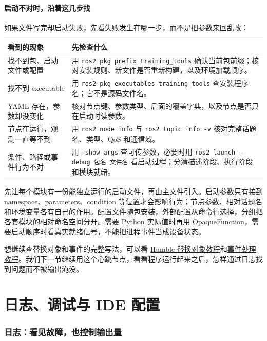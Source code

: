 \paragraph*{启动不对时，沿着这几步找}
如果文件写完却启动失败，先看失败发生在哪一步，而不是把参数来回乱改：
\begin{center}
\begin{tabular}{p{}p{}}
\toprule[1.5pt]
看到的现象 & 先检查什么 \\
\midrule[1pt]
找不到包、启动文件或配置 & 用 \texttt{ros2 pkg prefix training\_tools} 确认当前包前缀；核对安装规则、新文件是否重新构建，以及环境加载顺序。\\
找不到 executable & 用 \texttt{ros2 pkg executables training\_tools} 查安装程序名；它不是源码文件名。\\
YAML 存在，参数却没变化 & 核对节点键、参数类型、后面的覆盖字典，以及节点是否只在启动时读参数。\\
节点在运行，观测一直等不到 & 用 \texttt{ros2 node info} 与 \texttt{ros2 topic info -v} 核对完整话题名、类型、QoS 和通信域。\\
条件、路径或事件行为不对 & 用 \texttt{--show-args} 查可传参数，必要时用 \texttt{ros2 launch --debug 包名 文件名} 看启动过程；分清描述阶段、执行阶段和模块就绪。\\
\bottomrule[1.5pt]
\end{tabular}
\end{center}

\begin{conclusion}
先让每个模块有一份能独立运行的启动文件，再由主文件引入。启动参数只有接到 namespace、parameters、condition 等位置才会影响行为；节点参数、相对话题名和环境变量各有自己的作用。配置文件随包安装，外部配置从命令行选择，分组把各套模块的相对命名空间分开。需要 Python 实际值时再用 OpaqueFunction，需要启动顺序时看真实就绪信号，不能把进程事件当成设备状态。
\end{conclusion}

想继续查替换对象和事件的完整写法，可以看 \href{https://docs.ros.org/en/humble/Tutorials/Intermediate/Launch/Using-Substitutions.html}{Humble 替换对象教程}和\href{https://docs.ros.org/en/humble/Tutorials/Intermediate/Launch/Using-Event-Handlers.html}{事件处理教程}。我们下一节继续用这个心跳节点，看看程序运行起来之后，怎样通过日志找到问题而不被输出淹没。

\section{日志、调试与 IDE 配置}
\subsubsection{日志：看见故障，也控制输出量}
\label{sec:ros2-logging}

